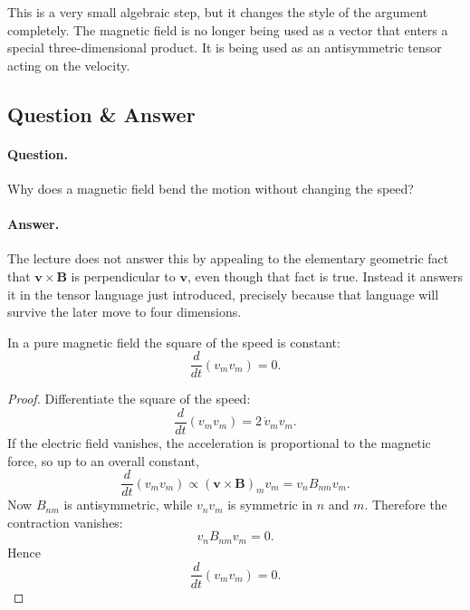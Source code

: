 This is a very small algebraic step, but it changes the style of the argument completely. The magnetic field is no longer being used as a vector that enters a special three-dimensional product. It is being used as an antisymmetric tensor acting on the velocity.

\subsection{Question \& Answer}

\paragraph{Question.} Why does a magnetic field bend the motion without changing the speed?

\paragraph{Answer.} The lecture does not answer this by appealing to the elementary geometric fact that \(\mathbf v\times\mathbf B\) is perpendicular to \(\mathbf v\), even though that fact is true. Instead it answers it in the tensor language just introduced, precisely because that language will survive the later move to four dimensions.

\begin{proposition}
In a pure magnetic field the square of the speed is constant:
\begin{equation}
\frac{d}{dt}(v_m v_m)=0.
\end{equation}
\end{proposition}

\begin{proof}
Differentiate the square of the speed:
\begin{equation}
\frac{d}{dt}(v_m v_m)=2\,\dot v_m v_m.
\end{equation}
If the electric field vanishes, the acceleration is proportional to the magnetic force, so up to an overall constant,
\begin{equation}
\frac{d}{dt}(v_m v_m)
\propto
(\mathbf v\times\mathbf B)_m v_m
=
v_n B_{nm} v_m.
\end{equation}
Now \(B_{nm}\) is antisymmetric, while \(v_n v_m\) is symmetric in \(n\) and \(m\). Therefore the contraction vanishes:
\begin{equation}
v_n B_{nm} v_m=0.
\end{equation}
Hence
\begin{equation}
\frac{d}{dt}(v_m v_m)=0.
\end{equation}
\end{proof}

